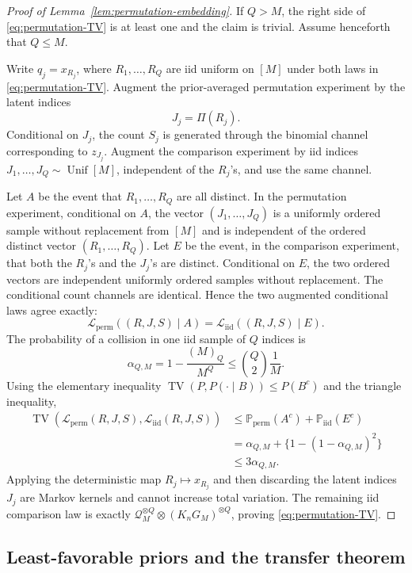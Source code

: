 \documentclass[11pt]{article}
\newcommand\pr{\mathbb P}
\newcommand{\TV}{\operatorname{TV}}
\newcommand{\calQ}{\mathcal Q}
\begin{document}
\begin{proof}[Proof of Lemma~\ref{lem:permutation-embedding}]
If $Q>M$, the right side of \eqref{eq:permutation-TV} is at least one and the claim is trivial.  Assume henceforth that $Q\le M$.

Write $q_j=x_{R_j}$, where $R_1,\dots,R_Q$ are iid uniform on $[M]$ under both laws in \eqref{eq:permutation-TV}.  Augment the prior-averaged permutation experiment by the latent indices
\[
J_j=\Pi(R_j).
\]
Conditional on $J_j$, the count $S_j$ is generated through the binomial channel corresponding to $z_{J_j}$.  Augment the comparison experiment by iid indices $J_1,\dots,J_Q\sim\operatorname{Unif}[M]$, independent of the $R_j$'s, and use the same channel.

Let $A$ be the event that $R_1,\dots,R_Q$ are all distinct.  In the permutation experiment, conditional on $A$, the vector $(J_1,\dots,J_Q)$ is a uniformly ordered sample without replacement from $[M]$ and is independent of the ordered distinct vector $(R_1,\dots,R_Q)$.  Let $E$ be the event, in the comparison experiment, that both the $R_j$'s and the $J_j$'s are distinct.  Conditional on $E$, the two ordered vectors are independent uniformly ordered samples without replacement.  The conditional count channels are identical.  Hence the two augmented conditional laws agree exactly:
\[
\mathcal L_{\mathrm{perm}}((R,J,S)\mid A)
=
\mathcal L_{\mathrm{iid}}((R,J,S)\mid E).
\]
The probability of a collision in one iid sample of $Q$ indices is
\[
\alpha_{Q,M}
=
1-\frac{(M)_Q}{M^Q}
\le
\binom Q2\frac1M.
\]
Using the elementary inequality $\TV(P,P(\cdot\mid B))\le P(B^c)$ and the triangle inequality,
\begin{align*}
\TV(\mathcal L_{\mathrm{perm}}(R,J,S),
     \mathcal L_{\mathrm{iid}}(R,J,S))
&\le
\pr_{\mathrm{perm}}(A^c)
+
\pr_{\mathrm{iid}}(E^c)\\
&=
\alpha_{Q,M}
+
\{1-(1-\alpha_{Q,M})^2\}\\
&\le3\alpha_{Q,M}.
\end{align*}
Applying the deterministic map $R_j\mapsto x_{R_j}$ and then discarding the latent indices $J_j$ are Markov kernels and cannot increase total variation.  The remaining iid comparison law is exactly $\calQ_M^{\otimes Q}\otimes(K_nG_M)^{\otimes Q}$, proving \eqref{eq:permutation-TV}.
\end{proof}

\subsection{Least-favorable priors and the transfer theorem}
\end{document}
